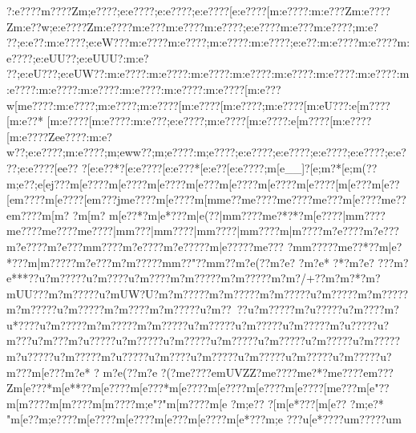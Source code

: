 {{{{{{{{{{{{{{{{{{{{{{{{{{{{{{{{{{{{{{{{{{{{{{{{{{{{{{{{{{{{{{{{{{{{{{{{{{{{{{{{{{{{{{{{{{{{{{{{{{{{{{{{{{{{{{{{{{{{{{{{{{{{{{{{{{{{{{{{{{{{{{{{{{{{{{{{{{{{{{{{{{{{{{{{{{{{{{{{{{{{{{{{{{{{{{{{{{{{{{{{{{{{{{{{{{{{{{{{{{{{{{{{{{{{{{{{{{{{{{{{{{{{{{{{{{{{{{{{{{{{{{{{{{{{{{{{{{{{{{{{{{{{{{{{{{{{{{{{{{{{{{{{{{{{{{{{{{{{{{{{{{{{{{{{{{{{{{{{{{{{{{{{{{{{{{{{{{{{{{{{{{{{{{{{{{{{{{{{{{{{{{{{{{{{{{{{{{{{{{{{{{{{{{{{{{{{{{{{{{{{{{{{{{{{{{{{{{{{{{{{{{{{{{{{{{{{{{{{{{{{{{{{{{{{{{{{{{{{{{{{{{{{{{{{{{{{{{{{{{{{{{{{{{{{{{{{{{{{{{{{{{{{{{{{{{{{{{{{{{{{{{{{{{{{{{{{{?}:e????{m?\????Zm;e????;e:e????;e:e????;e:e????[e:e????[m:e????:m:e???Zm:e????Zm:e??w;e:e????Zm:e????m:e???m:e????m:e????;e:e????m:e???m:e????;m:e???;e:e??:m:e????;e:eW???m:e????m:e????;m:e????:m:e????;e:e??:m:e????m:e????m:e????;e:eUU??;e:eUUU?:m:e???;e:eU???;e:eUW??:m:e????:m:e????:m:e????:m:e????:m:e????:m:e????:m:e????:m:e????:m:e????:m:e????:m:e????:m:e????:m:e????[m:e???w[me????:m:e????;m:e????;m:e????[m:e????[m:e????;m:e????[m:eU???:e[m????[m:e??*
[m:e????[m:e????:m:e???;e:e????;m:e????[m:e????:e[m????[m:e????[m:e????Zee????:m:e?w??;e:e????;m:e????;m;eww??;m;e????:m;e????;e:e????;e:e????;e:e????;e:e????;e:e???;e:e????[ee??
?[e:e??*?[e:e????[e:e???*[e:e??  [e:e????;m[e__]?[e;m  ?*[e;m(??{m;e??;e[ej???{m[e????{m[e????{m[e????{m[e???{m[e????{m[e????{m[e????[m[e???{m[e??[e{m????{m[e????[e{m???j{m{e????{m[e????{m[m   {m{e??{m{e????{m{e????{m{e???{m[e????{m{e??{e{m????{m[m?  ?{m[m?
{m[e??*?{m|e*???{m|e (??|m{m????{m{e?*?*?m[e????|m{m????{m{e????{m{e????{m{e????|m{m???|m{m????|m{m????|m{m????{m|m????{m?e????{m?e???{m?e????{m?e???m{m????{m?e????{m?e?????m|e?????m{e???
?m{m?????m{e??*??m|e?*???m|m?????m?e???m?m?????m{m??"??m{m??m?e (??m?e?
?m?e*
?*?m?e?
???m?e***??u?m?????u?m????u?m???{?m?m?????m?m?????m?m?/+??m?m?  *?m?mUU???m?m?????u?mUW?U?m?m?????m?m?????m?m?????u?m?????m?m?????m?m?????u?m?????m?m????m?m?????u?m??~??u?m?????m?u?????u?m????m?u*????u?m?????m?m?????m?m?????u?m?????u?m?????u?m?????m?u?????u?m???u?m???m?u?????u?m?????u?m?????u?m?????u?m?????u?m?????u?m?????m?u?????u?m?????m?u?????u?m????u?m?????u?m?????u?m?????u?m?????u?m???m[e??? {m?e*
?
{m?e(?? {m?e
?(?{m{e????{e{mUVZZ?m{e????{m{e?*?{m{e????{e{m???Z{m[e???*{m[e**??{m[e????{m[e???*{m[e????{m[e????{m[e????{m[e????[m{e ???{m[e"??{m[m????{m[m????{m[m????{m;e" ?"{m[m????{m[e
?{m;e?? ?[m[e*???[m[e?? ?{m;e?*
"{m[e??{m;e????{m[e????{m[e????{m[e???{m[e????{m[e*???{m;e 
???u[e*????u{m?????u{m
}}}}}}}}}}}}}}}}}}}}}}}}}}}}}}}}}}}}}}}}}}}}}}}}}}}}}}}}}}}}}}}}}}}}}}}}}}}}}}}}}}}}}}}}}}}}}}}}}}}}}}}}}}}}}}}}}}}}}}}}}}}}}}}}}}}}}}}}}}}}}}}}}}}}}}}}}}}}}}}}}}}}}}}}}}}}}}}}}}}}}}}}}}}}}}}}}}}}}}}}}}}}}}}}}}}}}}}}}}}}}}}}}}}}}}}}}}}}}}}}}}}}}}}}}}}}}}}}}}}}}}}}}}}}}}}}}}}}}}}}}}}}}}}}}}}}}}}}}}}}}}}}}}}}}}}}}}}}}}}}}}}}}}}}}}}}}}}}}}}}}}}}}}}}}}}}}}}}}}}}}}}}}}}}}}}}}}}}}}}}}}}}}}}}}}}}}}}}}}}}}}}}}}}}}}}}}}}}}}}}}}}}}}}}}}}}}}}}}}}}}}}}}}}}}}}}}}}}}}}}}}}}}}}}}}}}}}}}}}}}}}}}}}}}}}}}}}}}}}}}}}}}}}}}}}}}}}}}}}}}}}}}}}}}}}}}}}}}}}}}}}}}}}}}}}}}}}}}}}}}}}}}}}}}}}}}}}}}}}}}}}}}}}}}}}}}}}}}}}}}}}}}}}}}}}}}}}}}}}}}}}}}}}}}}}}}}}}}}}}}}}}}}}}}}}}}}}}}}
